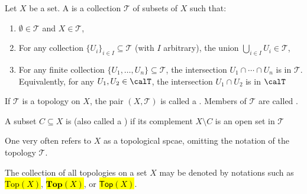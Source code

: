 \begin{definition}[Topology] \label{definition:topological_space}
Let $X$ be a set. A  is a collection $\mathcal{T}$ of subsets of $X$ such that:
\begin{enumerate}
    \item $\emptyset \in \mathcal{T}$ and $X \in \mathcal{T}$,

    \item For any collection $\{ U_i \}_{i \in I} \subseteq \mathcal{T}$ (with $I$ arbitrary), the union $\bigcup_{i \in I} U_i \in \mathcal{T}$,

    \item For any finite collection $\{ U_1, \ldots, U_n \} \subseteq \mathcal{T}$, the intersection $U_1 \cap \cdots \cap U_n$ is in $\mathcal{T}$. Equivalently, for any $U_1,U_2 \in \calT$, the intersection $U_1 \cap U_2$ is in $\calT$
\end{enumerate}
If $\mathcal{T}$ is a topology on $X$, the pair $(X, \mathcal{T})$ is called a . Members of $\mathcal{T}$ are called . 

A subset $C \subseteq X$ is  (also called a ) if its complement $X \setminus C$ is an open set in $\mathcal{T}$

One very often refers to $X$ as a topological spcae, omitting the notation of the topology $\mathcal{T}$. 

The collection of all topologies on a set $X$ may be denoted by notations such as \hl{$\mathrm{Top}(X)$}, \hl{$\mathbf{Top}(X)$}, or \hl{$\mathsf{Top}(X)$}.
\end{definition}





